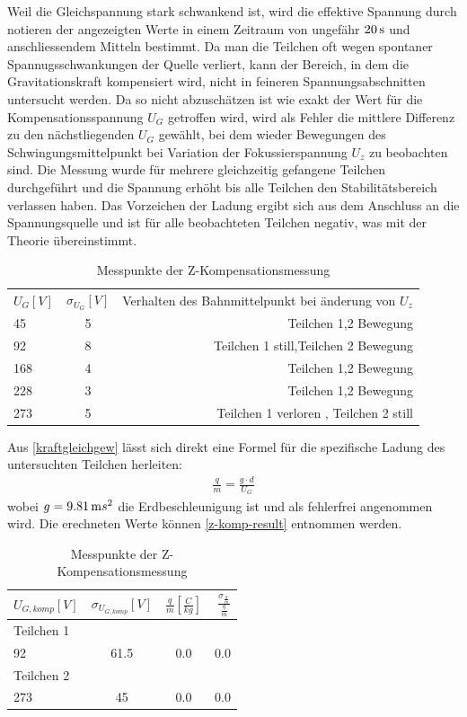 \documentclass[a4paper,12pt]{article}
\begin{document}
Weil die Gleichspannung stark schwankend ist, wird die effektive Spannung durch notieren der angezeigten Werte in einem Zeitraum von ungefähr $\unit[20]{s}$ und anschliessendem Mitteln bestimmt.
Da man die Teilchen oft wegen spontaner Spannugsschwankungen der Quelle verliert, kann der Bereich, in dem die Gravitationskraft kompensiert wird, nicht in feineren Spannungsabschnitten untersucht werden.
Da so nicht abzuschätzen ist wie exakt der Wert für die Kompensationsspannung $U_G$ getroffen wird,
wird als Fehler die mittlere Differenz zu den nächstliegenden $U_G$ gewählt, bei dem wieder Bewegungen des Schwingungsmittelpunkt bei Variation der Fokussierspannung $U_z$ zu beobachten sind.
Die Messung wurde für mehrere gleichzeitig gefangene Teilchen durchgeführt und die Spannung erhöht bis alle Teilchen den Stabilitätsbereich verlassen haben.
Das Vorzeichen der Ladung ergibt sich aus dem Anschluss an die Spannungsquelle und ist für alle beobachteten Teilchen negativ, was mit der Theorie übereinstimmt.

\begin{table}
	\centering
	\begin{tabular}{ l | c | r }
		$U_{G} [V]$ & $\sigma_{U_{G}}[V]$ & Verhalten des Bahnmittelpunkt bei änderung von $U_z$  \\
		45 & 5 & Teilchen 1,2 Bewegung   \\
		92 & 8 & Teilchen 1 still,Teilchen 2 Bewegung \\
		168 & 4 & Teilchen 1,2 Bewegung    \\
		228 & 3 & Teilchen 1,2 Bewegung \\
		273 & 5 & Teilchen 1 verloren , Teilchen 2 still \\
	\end{tabular}
\caption{Messpunkte der Z-Kompensationsmessung}
\label{tab:z-komp-measure}
\end{table}

Aus \ref{kraftgleichgew} lässt sich direkt eine Formel für die spezifische Ladung des untersuchten Teilchen herleiten:
\begin{align}\label{zspezm}
	\frac{q}{m} = \frac{g \cdot  d}{U_{G}}
\end{align}
wobei $g = \unit[9.81]{m}{s^2}$ die Erdbeschleunigung ist und als fehlerfrei angenommen wird.
Die erechneten Werte können \ref{z-komp-result} entnommen werden.


\begin{table}
	\centering
	\begin{tabular}{ l | c | c| r }
		$U_{G,komp} [V]$ & $\sigma_{U_{G,komp}}[V]$ & $\frac{q}{m}[\frac{C}{kg}]$ & $\frac{\sigma_{\frac{q}{m}}}{\frac{q}{m}}$  \\
		\hline
		\hline
		Teilchen 1 \\
		92 & 61.5 & 0.0 & 0.0 \\
		\hline
		Teilchen 2 \\
		273 & 45 & 0.0 & 0.0 \\
	\end{tabular}
\caption{Messpunkte der Z-Kompensationsmessung}
\label{tab:z-komp-result}
\end{table}
\end{document}
